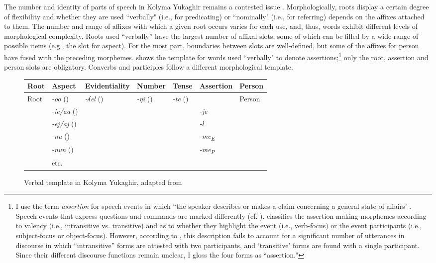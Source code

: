 \documentclass[output=paper,colorlinks,citecolor=brown
\ChapterDOI{10.5281/zenodo.15697581}
]{langscibook}
\begin{document}
The number and identity of parts of speech in Kolyma Yukaghir remains a contested issue \citep{Ventayol-Boada-et-al2023}. 
Morphologically, roots display a certain degree of flexibility and whether they are used ``verbally" (i.e., for predicating) or ``nominally" (i.e., for referring) depends on the affixes attached to them. 
The number and range of affixes with which a given root occurs varies for each use, and, thus, words exhibit different levels of morphological complexity. 
Roots used ``verbally'' have the largest number of affixal slots, some of which can be filled by a wide range of possible items (e.g., the slot for aspect). 
For the most part, boundaries between slots are well-defined, but some of the affixes for person have fused with the preceding morphemes. 
 shows the template for words used ``verbally" to denote assertions;\footnote{I use the term \textit{assertion} for speech events in which ``the speaker describes or makes a claim concerning a general state of affairs' \citep[3]{Vatanen2014}. Speech events that express questions and commands are marked differently (cf. \citealt{Silverstein1976, VanValin2003}). \citet{Maslova2003} classifies the assertion-making morphemes according to valency (i.e., intransitive vs. transitive) and as to whether they highlight the event (i.e., verb-focus) or the event participants (i.e., subject-focus or object-focus). However, according to \citet{ventayol-boada-2023}, this description fails to account for a significant number of utterances in discourse in which ``intransitive'' forms are attested with two participants, and ‘transitive’ forms are found with a single participant. Since their different discourse functions remain unclear, I gloss the four forms as \Ass{} ``assertion."} only the root, assertion and person slots are obligatory.
Converbs and participles follow a different morphological template.

\begin{figure}
\small
\begin{tabular}{l|l|l|l|l|l|l}
 {Root} & { {Aspect}} & { {Evidentiality}} & { {Number}} & { {Tense}} & { {Assertion}} & { {Person}} \\
 \hline
\multirow{6}{*}{Root} & \textit{-oo} (\Res{}) & \multirow{6}{*}{\textit{-ʎel} (\Ev{})} & \multirow{6}{*}{\textit{-ŋi} (\Pl{})} & \multirow{6}{*}{\textit{-te} (\Fut{})} &  & \multirow{6}{*}{Person}    \\
 & \textit{-ie/aa} (\Inch{}) &  &  &  & \textit{-je} & \\
 & \textit{-ej/aj} (\Pfv{}) &  &  &  & \textit{-l}  &  \\
 & \textit{-nu} (\Impf{}) &  &  &  & \textit{-me\textsubscript{E}}  &  \\
 & \textit{-nun} (\Hab{}) &  &  &  & \textit{-me\textsubscript{P}}  &  \\
 & etc. &  &  &  &  &  \\
\end{tabular}
\caption{Verbal template in Kolyma Yukaghir, adapted from \citet{Maslova2001}}
\label{fig:verb-template}
\end{figure}
\end{document}
